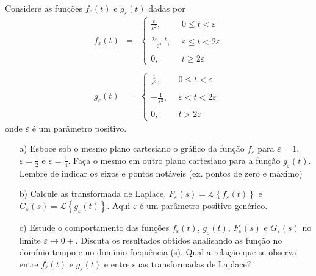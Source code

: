 \begin{exer}{\label{ex_delta_dirac0}} Considere as funções $f_\varepsilon (t)$  e $g_\varepsilon (t)$ dadas por
\begin{eqnarray*}
 f_\varepsilon(t)&=&\left\{\begin{array}{ll}
			    \frac{t}{\varepsilon^2}, ~~ &0\leq t < \varepsilon\\~\\
			    \frac{2\varepsilon-t}{\varepsilon^2}, ~~ &\varepsilon\leq t < 2\varepsilon\\~\\
			    0,&t\geq 2\varepsilon
			    \end{array}
\right.\\~\\
g_\varepsilon(t)&=&\left\{\begin{array}{ll}
			    \frac{1}{\varepsilon^2}, ~~ &0\leq t < \varepsilon\\~\\
			    -\frac{1}{\varepsilon^2}, ~~ &\varepsilon< t < 2\varepsilon\\~\\
			    0,&t>2\varepsilon
			    \end{array}
\right.
\end{eqnarray*}
onde $\varepsilon$ é um parâmetro positivo.
\begin{itemize}
  \item [a)] Esboce sob o mesmo plano cartesiano o gráfico da função $f_\varepsilon$ para $\varepsilon=1$, $\varepsilon=\frac{1}{2}$ e $\varepsilon=\frac{1}{4}$. Faça o mesmo em outro plano cartesiano para a função $g_\varepsilon(t)$. Lembre de indicar os eixos e pontos notáveis (ex. pontos de zero e máximo)
  \item [b)] Calcule as transformada de Laplace, $F_\varepsilon(s)=\mathcal{L}\left\{f_\varepsilon(t)\right\}$ e $G_\varepsilon(s)=\mathcal{L}\left\{g_\varepsilon(t)\right\}$. Aqui $\varepsilon$ é um parâmetro positivo genérico.
\item [c)] Estude o comportamento das funções $f_\varepsilon(t)$, $g_\varepsilon(t)$, $F_\varepsilon(s)$ e $G_\varepsilon(s)$ no limite $\varepsilon\to 0+$. Discuta os resultados obtidos analisando as função no domínio tempo e no domínio frequência (s). Qual a relação que se observa entre $f_\varepsilon(t)$ e $g_\varepsilon(t)$ e entre suas transformadas de Laplace?
\end{itemize}
\end{exer}



